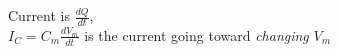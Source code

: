 \documentclass[preview]{standalone}
\begin{document}
\begin{center}
Current is $\frac{dQ}{dt}$,\\$I_C = C_m\frac{dV_m}{dt}$ is the current going toward \emph{changing} $V_m$
\end{center}
\end{document}
